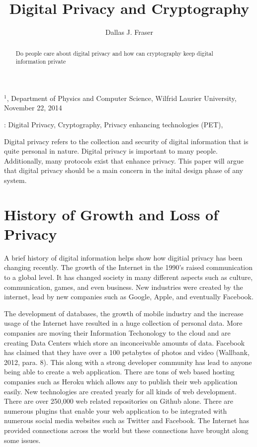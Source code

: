 \documentclass[12pt]{article}
\title{Digital Privacy and Cryptography}
\author{
	Dallas J. Fraser\inst{1}
}
\def\inst#1{$^{#1}$}
\begin{document}
\maketitle

\begin{center}
{\footnotesize

\inst{1}, Department of Physics and Computer Science, Wilfrid Laurier 
University, November 22, 2014}

\end{center}

\begin{abstract}
Do people care about digital privacy and how can cryptography keep digital information private
\end{abstract}

: Digital Privacy, Cryptography, Privacy enhancing technologies (PET),

\clearpage

Digital privacy refers to the collection and security of digital information that is quite personal in nature. Digital privacy is important to many people. Additionally, many protocols exist that enhance privacy. This paper will argue that digital privacy should be a main concern in the inital design phase of any system. 

\section{History of Growth and Loss of Privacy}\label{sec:history}

A brief history of digital information helps show how digitial privacy has been changing recently. The growth of the Internet in the 1990's raised communication to a global level. It has changed society in many different aspects such as culture, communication, games, and even business. New industries were created by the internet, lead by new companies such as Google, Apple, and eventually Facebook.

The development of databases, the growth of mobile industry  and the increase usage of the Internet have resulted in a huge collection of personal data. More companies are moving their Information Techonology to the cloud and are creating Data Centers which store an inconceivable amounts of data. Facebook has claimed that they have over a 100 petabytes of photos and video (Wallbank, 2012, para. 8). This along with a strong developer community has lead to anyone being able to create a web application. There are tons of web based hosting companies such as Heroku which allows any to publish their web application easily. New technologies are created yearly for all kinds of web development. There are over 250,000 web related repositories on Github alone. There are numerous plugins that enable your web application to be integrated with numerous social media websites such as Twitter and Facebook. The Internet has provided connections across the world but these connections have brought along some issues.
\end{document}
